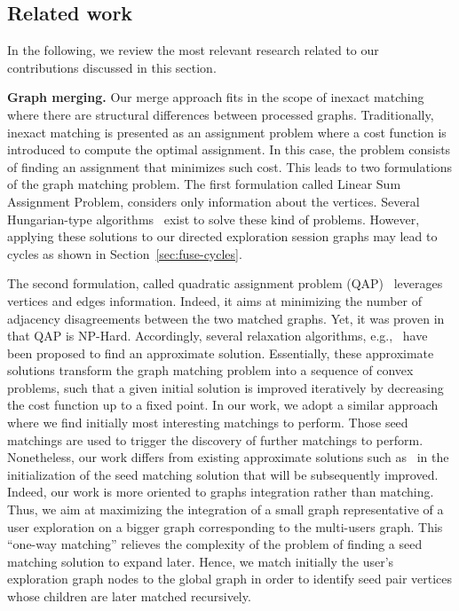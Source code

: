 \subsection{Related work}
\label{sec:collab-related-work}  


In the following, we review the most relevant research related to our contributions discussed in this section.  


\noindent \textbf{Graph merging.}  Our merge approach fits in the scope of inexact matching~\cite{Yan:2016} where there are structural differences between processed graphs.
Traditionally, inexact matching is presented as an assignment problem where a cost function is introduced to compute the optimal assignment.
 In this case, the problem consists of finding an assignment that minimizes such cost. 
This leads to two formulations of the graph matching problem. 
The first formulation called Linear Sum Assignment Problem, considers only information about the vertices. Several Hungarian-type algorithms~\cite{Kuhn55thehungarian,JonkerV87} exist to solve these kind of problems. 
 However, applying these solutions to our directed exploration session graphs may lead to cycles as shown in Section~\ref{sec:fuse-cycles}.
 
The second formulation, called quadratic assignment problem (QAP)~\cite{RePEc:cwl} leverages vertices and edges information.
Indeed, it aims at minimizing the number of adjacency disagreements between the two matched graphs. 
Yet, it was proven in~\cite{rainier:09} that QAP is NP-Hard. Accordingly, several relaxation algorithms, e.g.,~\cite{Leordeanu:2009:IPF,Liu:2014:GNC} have been proposed to find an approximate solution.
Essentially, these approximate solutions 
transform the graph matching problem into a sequence of convex problems, such that a given initial solution is improved iteratively by decreasing the cost function up to a fixed point.
In our work, we adopt a similar approach where we find initially most interesting matchings to perform. Those seed matchings are used to trigger the discovery of further matchings to perform.
Nonetheless, our work differs from existing approximate solutions such as~\cite{Leordeanu:2009:IPF,Liu:2014:GNC} in the initialization of the seed matching solution that will be subsequently improved.
Indeed, our work is more oriented to graphs integration rather than matching. 
Thus, we aim at maximizing the integration of a small graph representative of a user exploration on a bigger graph corresponding to the multi-users graph.
This ``one-way matching'' relieves the complexity of the problem of finding a seed matching solution to expand later.
Hence, we match initially the user's exploration graph nodes to the global graph in order to identify seed pair vertices whose children are later matched recursively.
 
